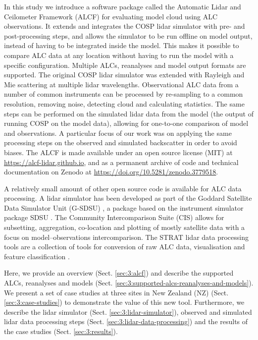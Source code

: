In this study we introduce a software package called the Automatic Lidar and Ceilometer
Framework (ALCF) for evaluating model cloud using ALC observations. It extends
and integrates the COSP lidar simulator \citep{chiriaco2006,chepfer2007,chepfer2008} with
pre- and post-processing steps, and allows the simulator to be run offline
on model output, instead of having to be integrated inside
the model. This makes it possible to compare ALC data at any location
without having to run the model with a specific configuration.
Multiple ALCs, reanalyses and model output formats are supported.
The original COSP lidar simulator was extended with Rayleigh and Mie scattering
at multiple lidar wavelengths. Observational ALC data from a number of common instruments can
be processed by re-sampling to a common resolution, removing noise, detecting cloud
and calculating statistics. The same steps can be performed on the simulated lidar data
from the model (the output of running COSP on the model data),
allowing for one-to-one comparison of model and observations.
A particular focus of our work was on applying the same processing steps on the
observed and simulated backscatter in order to
avoid biases. The ALCF is made available under an open source license (MIT)
at \url{https://alcf-lidar.github.io}, and as a permanent archive
of code and technical documentation on Zenodo at
\url{https://doi.org/10.5281/zenodo.3779518}.

A relatively small amount of other open source code is available for
ALC data processing. A lidar simulator has been developed as part of the Goddard
Satellite Data Simulator Unit (G-SDSU) \citep{G-SDSU}, a package based on the
instrument simulator package SDSU \citep{masunaga2010}. The Community
Intercomparison Suite (CIS) \citep{watson2016} allows for subsetting,
aggregation, co-location and plotting of mostly satellite
data with a focus on model--observations intercomparison. The STRAT lidar
data processing tools
are a collection of tools for conversion of raw ALC data, visualisation and feature
classification \citep{morille2007}.

Here, we provide an overview (Sect. \ref{sec:3:alcf}) and describe
the supported ALCs, reanalyses and models (Sect. \ref{sec:3:supported-alcs-reanalyses-and-models}).
We present a set of case studies at three sites in New Zealand (NZ)
(Sect. \ref{sec:3:case-studies}) to demonstrate the value of this new tool.
Furthermore, we describe the lidar simulator (Sect. \ref{sec:3:lidar-simulator}), observed and simulated lidar data processing steps (Sect. \ref{sec:3:lidar-data-processing}) and the results of the case studies
(Sect. \ref{sec:3:results}).

